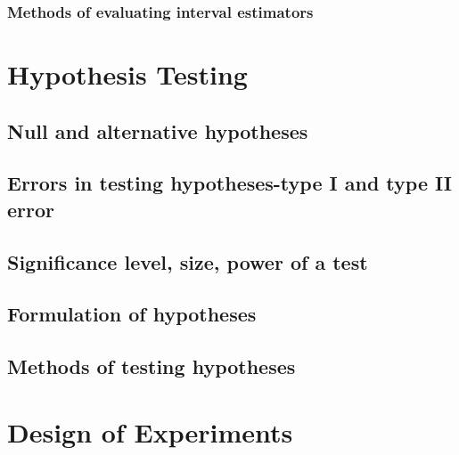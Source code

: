 \documentclass[]{book}
\begin{document}
\hypertarget{methods-of-evaluating-interval-estimators}{%
\subsection{Methods of evaluating interval estimators}\label{methods-of-evaluating-interval-estimators}}

\hypertarget{hypothesis-testing}{%
\chapter{Hypothesis Testing}\label{hypothesis-testing}}

\hypertarget{null-and-alternative-hypotheses}{%
\section{Null and alternative hypotheses}\label{null-and-alternative-hypotheses}}

\hypertarget{errors-in-testing-hypotheses-type-i-and-type-ii-error}{%
\section{Errors in testing hypotheses-type I and type II error}\label{errors-in-testing-hypotheses-type-i-and-type-ii-error}}

\hypertarget{significance-level-size-power-of-a-test}{%
\section{Significance level, size, power of a test}\label{significance-level-size-power-of-a-test}}

\hypertarget{formulation-of-hypotheses}{%
\section{Formulation of hypotheses}\label{formulation-of-hypotheses}}

\hypertarget{methods-of-testing-hypotheses}{%
\section{Methods of testing hypotheses}\label{methods-of-testing-hypotheses}}

\hypertarget{design-of-experiments}{%
\chapter{Design of Experiments}\label{design-of-experiments}}
\end{document}
